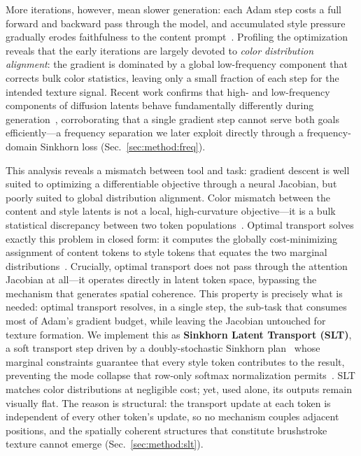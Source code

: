 More iterations, however, mean slower generation: each Adam step costs a full
forward and backward pass through the model, and accumulated style pressure
gradually erodes faithfulness to the content
prompt~\cite{radford2021learning}.
Profiling the optimization reveals that the early iterations are
largely devoted to \emph{color distribution alignment}: the gradient is
dominated by a global low-frequency component that corrects bulk color
statistics, leaving only a small fraction of each step for the intended
texture signal.
Recent work confirms that high- and low-frequency components of diffusion
latents behave fundamentally differently during
generation~\cite{huang2025fresca,yuan2025consisid}, corroborating that a
single gradient step cannot serve both goals efficiently---a frequency
separation we later exploit directly through a frequency-domain Sinkhorn loss
(Sec.~\ref{sec:method:freq}).

This analysis reveals a mismatch between tool and task: gradient
descent is well suited to optimizing a differentiable objective through a
neural Jacobian, but poorly suited to global distribution alignment.
Color mismatch between the content and style latents is not a local,
high-curvature objective—it is a bulk statistical discrepancy between two
token populations~\cite{huang2017arbitrary}.
Optimal transport solves exactly this problem in closed form: it computes the
globally cost-minimizing assignment of content tokens to style tokens that
equates the two marginal
distributions~\cite{villani2009optimal,peyre2019computational,haviv2025wasserstein}.
Crucially, optimal transport does not pass through the attention Jacobian at
all—it operates directly in latent token space, bypassing the mechanism that
generates spatial coherence.
This property is precisely what is needed: optimal transport
resolves, in a single step, the sub-task that consumes most of Adam's
gradient budget, while leaving the Jacobian untouched for texture formation.
We implement this as \textbf{Sinkhorn Latent Transport (SLT)}, a soft
transport step driven by a doubly-stochastic Sinkhorn
plan~\cite{cuturi2013sinkhorn} whose marginal constraints guarantee that every
style token contributes to the result, preventing the mode collapse that
row-only softmax normalization permits~\cite{peyre2019computational}.
SLT matches color distributions at negligible cost; yet, used alone, its
outputs remain visually flat.
The reason is structural: the transport update at each token is independent of
every other token's update, so no mechanism couples adjacent positions, and
the spatially coherent structures that constitute brushstroke texture cannot
emerge (Sec.~\ref{sec:method:slt}).

